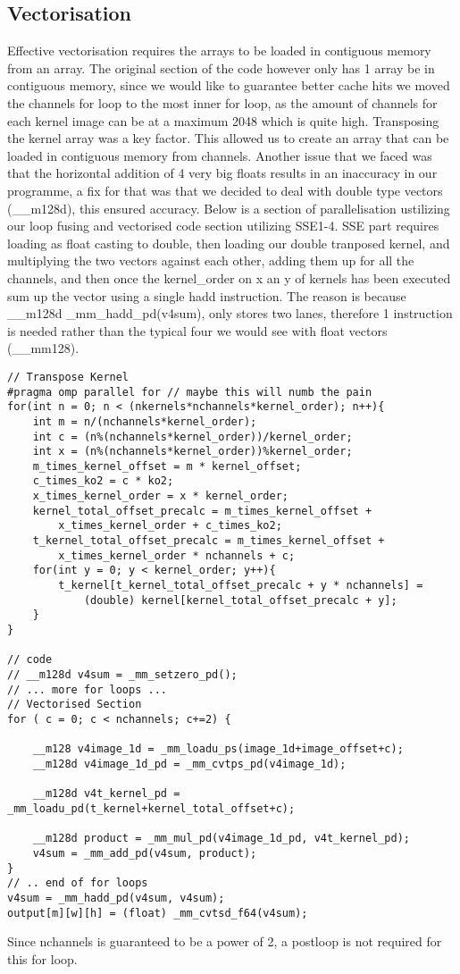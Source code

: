 \documentclass[12pt,fleqn,leqno,letterpaper]{article}
\begin{document}
\subsection{Vectorisation}
Effective vectorisation requires the arrays to be loaded in contiguous memory from an array. The
original section of the code however only has 1 array be in contiguous memory, since we would like to
guarantee better cache hits we moved the channels for loop to the most inner for loop, as the amount of
channels for each kernel image can be at a maximum 2048 which is quite high. 
Transposing the kernel array was a key factor. This allowed us to create an array that can be loaded in contiguous
memory from channels. Another issue that we faced was that the horizontal addition of 4 very big floats results in
an inaccuracy in our programme, a fix for that was that we decided to deal with double type vectors (\_\_m128d), this
ensured accuracy. Below is a section of parallelisation ustilizing our loop fusing and vectorised code section utilizing
SSE1-4. SSE part requires loading as float casting to double, then loading our double tranposed kernel, and multiplying
the two vectors against each other, adding them up for all the channels, and then once the kernel\_order on x an y of kernels
has been executed sum up the vector using a single hadd instruction. The reason is because \_\_m128d \_mm\_hadd\_pd(v4sum), only
stores two lanes, therefore 1 instruction is needed rather than the typical four we would see with float vectors (\_\_mm128).
\begin{verbatim}
// Transpose Kernel
#pragma omp parallel for // maybe this will numb the pain
for(int n = 0; n < (nkernels*nchannels*kernel_order); n++){
    int m = n/(nchannels*kernel_order);
    int c = (n%(nchannels*kernel_order))/kernel_order; 
    int x = (n%(nchannels*kernel_order))%kernel_order; 
    m_times_kernel_offset = m * kernel_offset;
    c_times_ko2 = c * ko2;
    x_times_kernel_order = x * kernel_order;
    kernel_total_offset_precalc = m_times_kernel_offset + 
        x_times_kernel_order + c_times_ko2;
    t_kernel_total_offset_precalc = m_times_kernel_offset + 
        x_times_kernel_order * nchannels + c;
    for(int y = 0; y < kernel_order; y++){
        t_kernel[t_kernel_total_offset_precalc + y * nchannels] = 
            (double) kernel[kernel_total_offset_precalc + y];
    }
}

// code
// __m128d v4sum = _mm_setzero_pd();
// ... more for loops ...
// Vectorised Section
for ( c = 0; c < nchannels; c+=2) {

    __m128 v4image_1d = _mm_loadu_ps(image_1d+image_offset+c);
    __m128d v4image_1d_pd = _mm_cvtps_pd(v4image_1d);

    __m128d v4t_kernel_pd = _mm_loadu_pd(t_kernel+kernel_total_offset+c);

    __m128d product = _mm_mul_pd(v4image_1d_pd, v4t_kernel_pd);
    v4sum = _mm_add_pd(v4sum, product);
}
// .. end of for loops
v4sum = _mm_hadd_pd(v4sum, v4sum);
output[m][w][h] = (float) _mm_cvtsd_f64(v4sum);
\end{verbatim}
Since nchannels is guaranteed to be a power of 2, a postloop is not required for this for loop.
\end{document}
